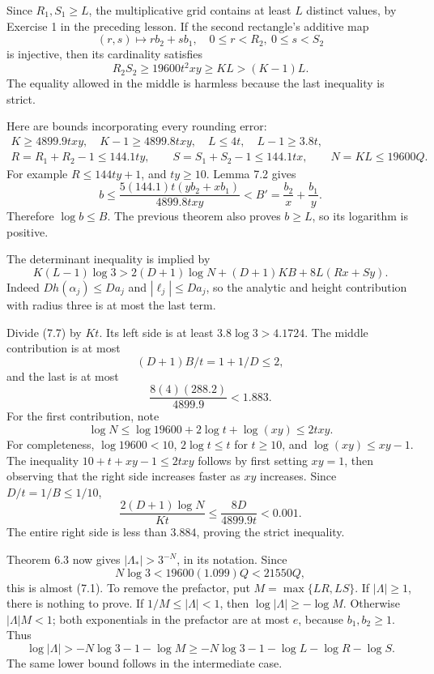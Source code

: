 \documentclass[
  11pt,
  a4paper,
]{article}
\begin{document}
Since \(R_1,S_1\ge L\), the multiplicative grid contains at least \(L\)
distinct values, by Exercise 1 in the preceding lesson. If the second
rectangle's additive map \[
(r,s)\longmapsto rb_2+sb_1,\quad 0\le r<R_2,\ 0\le s<S_2
\] is injective, then its cardinality satisfies \[
R_2S_2\ge19600t^2xy\ge KL>(K-1)L. \tag{7.5}
\] The equality allowed in the middle is harmless because the last
inequality is strict.

Here are bounds incorporating every rounding error: \[
\begin{gathered}
K\ge4899.9txy,\quad K-1\ge4899.8txy,\quad
L\le4t,\quad L-1\ge3.8t,\\
R=R_1+R_2-1\le144.1ty,\qquad
S=S_1+S_2-1\le144.1tx,\qquad
N=KL\le19600Q.
\end{gathered} \tag{7.6}
\] For example \(R\le144ty+1\), and \(ty\ge10\). Lemma 7.2 gives \[
b\le\frac{5(144.1)t(yb_2+xb_1)}{4899.8txy}
<B'=\frac{b_2}{x}+\frac{b_1}{y}.
\] Therefore \(\log b\le B\). The previous theorem also proves
\(b\ge L\), so its logarithm is positive.

The determinant inequality is implied by \[
K(L-1)\log3>
2(D+1)\log N+(D+1)KB+8L(Rx+Sy). \tag{7.7}
\] Indeed \(Dh(\alpha_j)\le Da_j\) and \(|\ell_j|\le Da_j\), so the
analytic and height contribution with radius three is at most the last
term.

Divide (7.7) by \(Kt\). Its left side is at least \(3.8\log3>4.1724\).
The middle contribution is at most \[
(D+1)B/t=1+1/D\le2,
\] and the last is at most \[
\frac{8(4)(288.2)}{4899.9}<1.883.
\] For the first contribution, note \[
\log N\le\log19600+2\log t+\log(xy)\le2txy.
\] For completeness, \(\log19600<10\), \(2\log t\le t\) for \(t\ge10\),
and \(\log(xy)\le xy-1\). The inequality \(10+t+xy-1\le2txy\) follows by
first setting \(xy=1\), then observing that the right side increases
faster as \(xy\) increases. Since \(D/t=1/B\le1/10\), \[
\frac{2(D+1)\log N}{Kt}
\le\frac{8D}{4899.9t}<0.001.
\] The entire right side is less than \(3.884\), proving the strict
inequality.

Theorem 6.3 now gives \(|\Lambda_*|>3^{-N}\), in its notation. Since \[
N\log3<19600(1.099)Q<21550Q,
\] this is almost (7.1). To remove the prefactor, put
\(M=\max\{LR,LS\}\). If \(|\Lambda|\ge1\), there is nothing to prove. If
\(1/M\le|\Lambda|<1\), then \(\log|\Lambda|\ge-\log M\). Otherwise
\(|\Lambda|M<1\); both exponentials in the prefactor are at most \(e\),
because \(b_1,b_2\ge1\). Thus \[
\log|\Lambda|>-N\log3-1-\log M
\ge-N\log3-1-\log L-\log R-\log S. \tag{7.8}
\] The same lower bound follows in the intermediate case.
\end{document}
